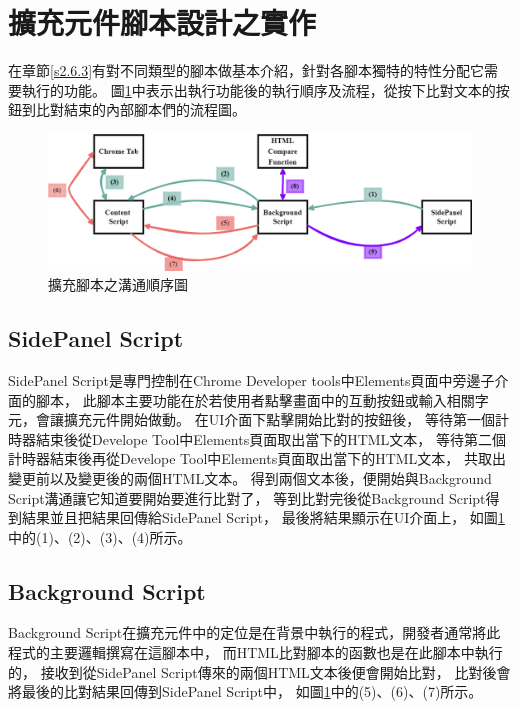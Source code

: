 \section{擴充元件腳本設計之實作}\label{s3.4}
\indent
在章節\ref{s2.6.3}有對不同類型的腳本做基本介紹，針對各腳本獨特的特性分配它需要執行的功能。
圖\ref{f3.7}中表示出執行功能後的執行順序及流程，從按下比對文本的按鈕到比對結束的內部腳本們的流程圖。

\indent

\begin{figure}[H]
    \centering
    \includegraphics[width=1\textwidth]{picture/ch3-script-structure.png}
    \caption{擴充腳本之溝通順序圖}
    \label{f3.7}
\end{figure}

\subsection{SidePanel Script}\label{s3.4.1}
SidePanel Script是專門控制在Chrome Developer tools中Elements頁面中旁邊子介面的腳本，
此腳本主要功能在於若使用者點擊畫面中的互動按鈕或輸入相關字元，會讓擴充元件開始做動。
在UI介面下點擊開始比對的按鈕後，
等待第一個計時器結束後從Develope Tool中Elements頁面取出當下的HTML文本，
等待第二個計時器結束後再從Develope Tool中Elements頁面取出當下的HTML文本，
共取出變更前以及變更後的兩個HTML文本。
得到兩個文本後，便開始與Background Script溝通讓它知道要開始要進行比對了，
等到比對完後從Background Script得到結果並且把結果回傳給SidePanel Script，
最後將結果顯示在UI介面上，
如圖\ref{f3.7}中的(1)、(2)、(3)、(4)所示。

\subsection{Background Script}\label{s3.4.2}
Background Script在擴充元件中的定位是在背景中執行的程式，開發者通常將此程式的主要邏輯撰寫在這腳本中，
而HTML比對腳本的函數也是在此腳本中執行的，
接收到從SidePanel Script傳來的兩個HTML文本後便會開始比對，
比對後會將最後的比對結果回傳到SidePanel Script中，
如圖\ref{f3.7}中的(5)、(6)、(7)所示。


